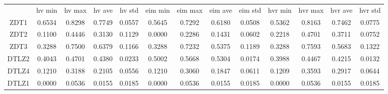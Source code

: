 \begin{tabular}{ccccccccccccc}
\hline
& hv min & hv max & hv ave & hv std & eim min & eim max & eim ave & eim std & hvr min & hvr max & hvr ave & hvr std \\
ZDT1 & 0.6534 & 0.8298 & 0.7749 & 0.0557 & 0.5645 & 0.7292 & 0.6180 & 0.0508 & 0.5362 & 0.8163 & 0.7462 & 0.0775 \\
ZDT2 & 0.1100 & 0.4446 & 0.3130 & 0.1129 & 0.0000 & 0.2286 & 0.1431 & 0.0602 & 0.2218 & 0.4701 & 0.3711 & 0.0752 \\
ZDT3 & 0.3288 & 0.7500 & 0.6379 & 0.1166 & 0.3288 & 0.7232 & 0.5375 & 0.1189 & 0.3288 & 0.7593 & 0.5683 & 0.1322 \\
DTLZ2 & 0.4043 & 0.4701 & 0.4380 & 0.0233 & 0.5002 & 0.5668 & 0.5304 & 0.0174 & 0.3988 & 0.4467 & 0.4215 & 0.0132 \\
DTLZ4 & 0.1210 & 0.3188 & 0.2105 & 0.0556 & 0.1210 & 0.3060 & 0.1847 & 0.0611 & 0.1209 & 0.3593 & 0.2917 & 0.0644 \\
DTLZ1 & 0.0000 & 0.0536 & 0.0155 & 0.0185 & 0.0000 & 0.0536 & 0.0155 & 0.0185 & 0.0000 & 0.0536 & 0.0155 & 0.0185 \\
\hline
\end{tabular}
